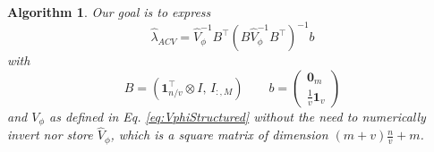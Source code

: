 \documentclass[11pt,dvipsnames]{article}
\newtheorem{algorithm}{Algorithm}
\begin{document}
\begin{appendices}
\begin{algorithm}\label{alg:shortcut} 
Our goal is to express
\begin{equation} 
 \widehat{\lambda}_{ACV}= \widehat{V}_{\phi}^{-1}B^{\top}\left( B \widehat{V}_{\phi}^{-1} B^{\top} \right)^{-1} b
\end{equation}
with
\begin{equation}
B=\left(  \mathbf{1}_{n/v}^{\top}\otimes I,\,I_{:,M} \right) \qquad b=
\begin{pmatrix}
\mathbf{0}_{m}\\
\frac{1}{v}\mathbf{1}_{v}
\end{pmatrix}
\end{equation}
and $ V_{\phi} $ as defined in Eq. \ref{eq:VphiStructured} without the need to numerically invert nor store $ \widehat{V}_{\phi} $, which is a square matrix of dimension $ (m+v)\frac{n}{v}+m $. 


\end{algorithm}
\end{appendices}
\end{document}
